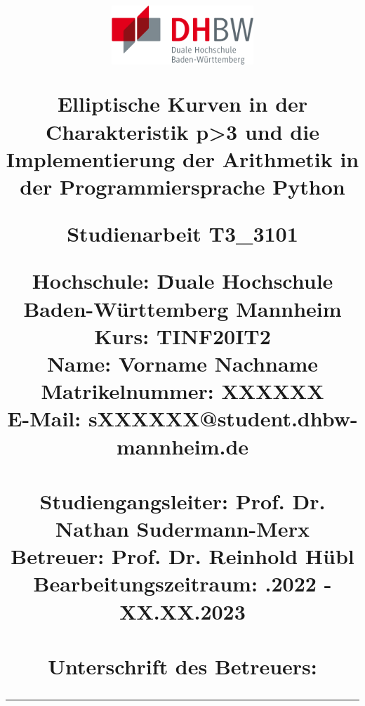 \begin{titlepage}
\centering
\title{		
	\includegraphics[width=0.4\textwidth]{grafiken/dhbw.png}\\       		 
	\vspace{1.0cm}
          
    \begin{singlespacing}
    {\Large Elliptische Kurven in der Charakteristik p>3 und die Implementierung der Arithmetik in der Programmiersprache Python}	\\
    \vspace{1.8cm}	
    \begin{normalfont}
	{\large Studienarbeit T3\_3101}
	\end{normalfont}
    \vspace{1.8cm}
    \begin{onehalfspacing}
    \begin{normalsize}
	\begin{normalfont}
	\begin{tabbing}
	Hochschule: \hspace{2.7cm} \= Duale Hochschule Baden-Württemberg Mannheim\\
	Kurs: \> TINF20IT2\\	
	Name: \> Vorname Nachname\\
	Matrikelnummer: \> XXXXXX\\	
	E-Mail: \> sXXXXXX@student.dhbw-mannheim.de\\			
	\vspace{1.0cm}\\
	Studiengangsleiter:  \> Prof. Dr. Nathan Sudermann-Merx\\
	Betreuer: \> Prof. Dr. Reinhold Hübl\\	
	Bearbeitungszeitraum: .2022 - XX.XX.2023\\	
	\vspace{1.0cm}\\
	Unterschrift des Betreuers: \> {\rule{6cm}{1pt}}\\
	\end{tabbing}
	\end{normalfont}
	\end{normalsize}
	\end{onehalfspacing}
	\end{singlespacing}	
}
\author{}
\date{} 
\maketitle		
\end{titlepage}